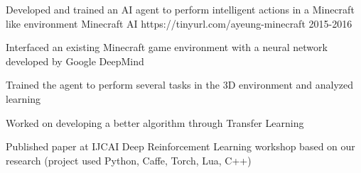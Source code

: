 \begin{cventries}

\vspace{-1.5em}
\cventry
{Developed and trained an AI agent to perform intelligent actions in a Minecraft like environment} %
{Minecraft AI} %
{https://tinyurl.com/ayeung-minecraft} %
{2015-2016} %
{ %
\begin{cvitems}
\item {Interfaced an existing Minecraft game environment with a neural network developed by Google DeepMind}
\item {Trained the agent to perform several tasks in the 3D environment and analyzed learning}
\item {Worked on developing a better algorithm through Transfer Learning}
\item {Published paper at IJCAI Deep Reinforcement Learning workshop based on our research (project used Python, Caffe, Torch, Lua, C++)}
\end{cvitems}
}




\end{cventries}
